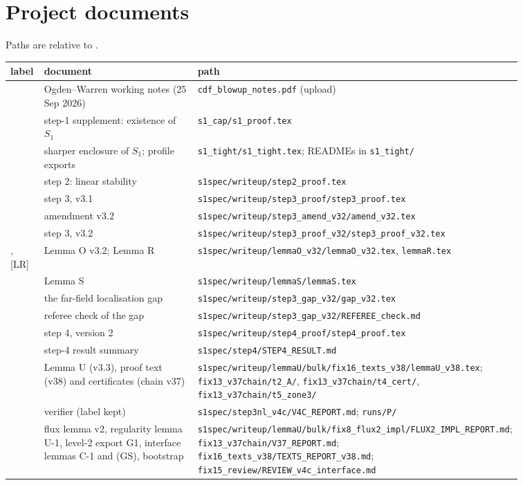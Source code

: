 \documentclass[11pt]{amsart}
\theoremstyle{definition}
\theoremstyle{remark}
\newcommand{\fn}[1]{\texttt{\detokenize{#1}}}
\newcommand{\dref}[1]{[\textsf{#1}]}
\newcommand{\pth}[1]{\nolinkurl{#1}}
\begin{document}
\appendix
\section{Project documents}\label{app:docs}
Paths are relative to \fn{/home/claude/}.
\begin{center}
\footnotesize
\begin{tabular}{@{}lp{0.30\linewidth}p{0.56\linewidth}@{}}\toprule
label & document & path\\\midrule
\dref{OW} & Ogden--Warren working notes (25 Sep 2026) & \pth{cdf_blowup_notes.pdf} (upload)\\
\dref{S1} & step-1 supplement: existence of $S_1$ & \pth{s1_cap/s1_proof.tex}\\
\dref{S1t} & sharper enclosure of $S_1$; profile exports & \pth{s1_tight/s1_tight.tex}; READMEs in \pth{s1_tight/}\\
\dref{S2} & step 2: linear stability & \pth{s1spec/writeup/step2_proof.tex}\\
\dref{S3} & step 3, v3.1 & \pth{s1spec/writeup/step3_proof/step3_proof.tex}\\
\dref{S3a} & amendment v3.2 & \pth{s1spec/writeup/step3_amend_v32/amend_v32.tex}\\
\dref{S3'} & step 3, v3.2 & \pth{s1spec/writeup/step3_proof_v32/step3_proof_v32.tex}\\
\dref{LO}, \dref{LR} & Lemma O v3.2; Lemma R & \pth{s1spec/writeup/lemmaO_v32/lemmaO_v32.tex}, \pth{lemmaR.tex}\\
\dref{LS} & Lemma S & \pth{s1spec/writeup/lemmaS/lemmaS.tex}\\
\dref{GAP} & the far-field localisation gap & \pth{s1spec/writeup/step3_gap_v32/gap_v32.tex}\\
\dref{REF} & referee check of the gap & \pth{s1spec/writeup/step3_gap_v32/REFEREE_check.md}\\
\dref{S4} & step 4, version 2 & \pth{s1spec/writeup/step4_proof/step4_proof.tex}\\
\dref{R4} & step-4 result summary & \pth{s1spec/step4/STEP4_RESULT.md}\\
\dref{LU} & Lemma U (v3.3), proof text (v38) and certificates (chain v37) & \pth{s1spec/writeup/lemmaU/bulk/fix16_texts_v38/lemmaU_v38.tex}; \pth{fix13_v37chain/t2_A/}, \pth{fix13_v37chain/t4_cert/}, \pth{fix13_v37chain/t5_zone3/}\\
\dref{V4B} & verifier \fn{fin13v4c} (label kept) & \pth{s1spec/step3nl_v4c/V4C_REPORT.md}; \pth{runs/P/}\\
\dref{FX2} & flux lemma v2, regularity lemma U-1, level-2 export G1, interface lemmas C-1 and (GS), bootstrap & \pth{s1spec/writeup/lemmaU/bulk/fix8_flux2_impl/FLUX2_IMPL_REPORT.md}; \pth{fix13_v37chain/V37_REPORT.md}; \pth{fix16_texts_v38/TEXTS_REPORT_v38.md}; \pth{fix15_review/REVIEW_v4c_interface.md}\\

\end{tabular}
\end{center}
\end{document}
